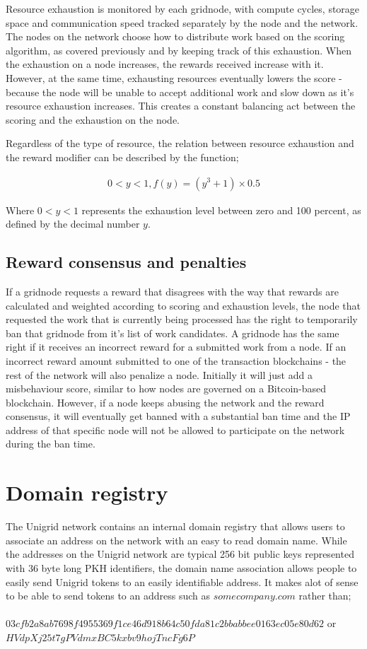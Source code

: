 \documentclass[10pt,a4paper,final]{article}
\begin{document}
Resource exhaustion is monitored by each \gls{gridnode}, with compute cycles, storage space and communication speed tracked separately by the node and the network. The nodes on the network choose how to distribute work based on the scoring algorithm, as covered previously and by keeping track of this exhaustion. When the exhaustion on a node increases, the rewards received increase with it. However, at the same time, exhausting resources eventually lowers the score - because the node will be unable to accept additional work and slow down as it's resource exhaustion increases. This creates a constant balancing act between the scoring and the exhaustion on the node.

Regardless of the type of resource, the relation between resource exhaustion and the reward modifier can be described by the function;

\[
	\begin{array}{l}
	0 < y < 1, f(y) = (y^3 + 1) \times 0.5
	\end{array}	
\]

Where $0 < y < 1$ represents the exhaustion level between zero and 100 percent, as defined by the decimal number $y$.

\subsection{Reward consensus and penalties}
If a \gls{gridnode} requests a reward that disagrees with the way that rewards are calculated and weighted according to scoring and exhaustion levels, the node that requested the work that is currently being processed has the right to temporarily ban that \gls{gridnode} from it's list of work candidates. A \gls{gridnode} has the same right if it receives an incorrect reward for a submitted work from a node. If an incorrect reward amount submitted to one of the transaction blockchains - the rest of the network will also penalize a node. Initially it will just add a misbehaviour score, similar to how nodes are governed on a Bitcoin-based blockchain. However, if a node keeps abusing the network and the reward consensus, it will eventually get banned with a substantial ban time and the IP address of that specific node will not be allowed to participate on the network during the ban time.


\section{Domain registry}
\label{section:domain}
The Unigrid network contains an internal domain registry that allows users to associate an address on the network with an easy to read domain name. While the addresses on the Unigrid network are typical 256 bit public keys represented with 36 byte long PKH identifiers, the domain name association allows people to easily send Unigrid tokens to an easily identifiable address. It makes alot of sense to be able to send tokens to an address such as $somecompany.com$ rather than;
\\ \\
$03cfb2a8ab7698f4955369f1ce46d918b64c50fda81c2bbabbee0163ec05e80d62$ or\\
$HVdpXj25t7gPVdmxBC5kxbv9hojTncFg6P$\\
\end{document}
